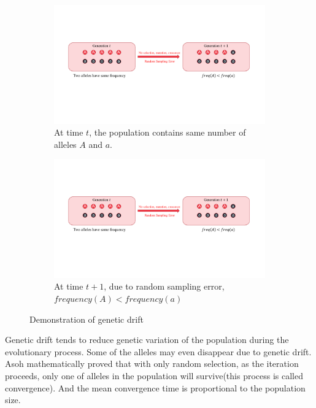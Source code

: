 \documentclass[conference]{IEEEtran}
\begin{document}
\begin{figure}[htbp]
	\centering
	\begin{subfigure}[b]{.3\textwidth}
		\includegraphics[width=\linewidth]{Section2/Generation_t}
		\caption{At time $t$, the population contains same number of alleles $A$ and $a$.}
	\end{subfigure}
	
	\begin{subfigure}[b]{.3\textwidth}
		\includegraphics[width=\linewidth]{Section2/Generation_t1}
		\caption{At time $t+1$, due to random sampling error, $frequency(A) < frequency(a)$}
	\end{subfigure}
	\caption{Demonstration of genetic drift}
	\label{fig:Genetic drift demo}
\end{figure}

Genetic drift tends to reduce genetic variation of the population during the evolutionary process. Some of the alleles may even disappear due to genetic drift. Asoh\cite{Asoh} mathematically proved that with only random selection, as the iteration proceeds, only one of alleles in the population will survive(this process is called convergence). And the mean convergence time is proportional to the population size. 
\end{document}

